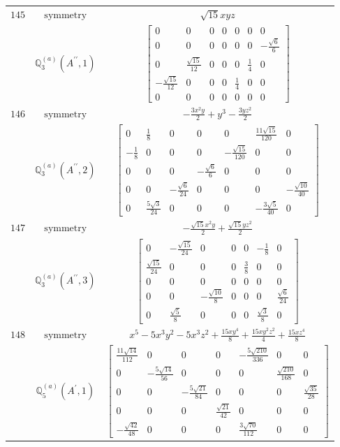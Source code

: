 \documentclass[fleqn,8pt,landscape]{jsarticle}
\begin{document}
\begin{longtable}{ccc}
$ 145 $ & $ \text{symmetry} $ & $ \sqrt{15} x y z $ \\
$  $ & $ \mathbb{Q}_{3}^{(a)}(A^{\prime\prime},1) $ & $ \begin{bmatrix} 0 & 0 & 0 & 0 & 0 & 0 & 0 \\ 0 & 0 & 0 & 0 & 0 & 0 & - \frac{\sqrt{6}}{6} \\ 0 & \frac{\sqrt{15}}{12} & 0 & 0 & 0 & \frac{1}{4} & 0 \\ - \frac{\sqrt{15}}{12} & 0 & 0 & 0 & \frac{1}{4} & 0 & 0 \\ 0 & 0 & 0 & 0 & 0 & 0 & 0 \end{bmatrix} $ \\ \hline
$ 146 $ & $ \text{symmetry} $ & $ - \frac{3 x^{2} y}{2} + y^{3} - \frac{3 y z^{2}}{2} $ \\
$  $ & $ \mathbb{Q}_{3}^{(a)}(A^{\prime\prime},2) $ & $ \begin{bmatrix} 0 & \frac{1}{8} & 0 & 0 & 0 & \frac{11 \sqrt{15}}{120} & 0 \\ - \frac{1}{8} & 0 & 0 & 0 & - \frac{\sqrt{15}}{120} & 0 & 0 \\ 0 & 0 & 0 & - \frac{\sqrt{6}}{6} & 0 & 0 & 0 \\ 0 & 0 & - \frac{\sqrt{6}}{24} & 0 & 0 & 0 & - \frac{\sqrt{10}}{40} \\ 0 & \frac{5 \sqrt{3}}{24} & 0 & 0 & 0 & - \frac{3 \sqrt{5}}{40} & 0 \end{bmatrix} $ \\ \hline
$ 147 $ & $ \text{symmetry} $ & $ - \frac{\sqrt{15} x^{2} y}{2} + \frac{\sqrt{15} y z^{2}}{2} $ \\
$  $ & $ \mathbb{Q}_{3}^{(a)}(A^{\prime\prime},3) $ & $ \begin{bmatrix} 0 & - \frac{\sqrt{15}}{24} & 0 & 0 & 0 & - \frac{1}{8} & 0 \\ \frac{\sqrt{15}}{24} & 0 & 0 & 0 & \frac{3}{8} & 0 & 0 \\ 0 & 0 & 0 & 0 & 0 & 0 & 0 \\ 0 & 0 & - \frac{\sqrt{10}}{8} & 0 & 0 & 0 & \frac{\sqrt{6}}{24} \\ 0 & \frac{\sqrt{5}}{8} & 0 & 0 & 0 & \frac{\sqrt{3}}{8} & 0 \end{bmatrix} $ \\ \hline
$ 148 $ & $ \text{symmetry} $ & $ x^{5} - 5 x^{3} y^{2} - 5 x^{3} z^{2} + \frac{15 x y^{4}}{8} + \frac{15 x y^{2} z^{2}}{4} + \frac{15 x z^{4}}{8} $ \\
$  $ & $ \mathbb{Q}_{5}^{(a)}(A^{\prime},1) $ & $ \begin{bmatrix} \frac{11 \sqrt{14}}{112} & 0 & 0 & 0 & - \frac{5 \sqrt{210}}{336} & 0 & 0 \\ 0 & - \frac{5 \sqrt{14}}{56} & 0 & 0 & 0 & \frac{\sqrt{210}}{168} & 0 \\ 0 & 0 & - \frac{5 \sqrt{21}}{84} & 0 & 0 & 0 & \frac{\sqrt{35}}{28} \\ 0 & 0 & 0 & \frac{\sqrt{21}}{42} & 0 & 0 & 0 \\ - \frac{\sqrt{42}}{48} & 0 & 0 & 0 & \frac{3 \sqrt{70}}{112} & 0 & 0 \end{bmatrix} $ \\ \hline

\end{longtable}
\end{document}
